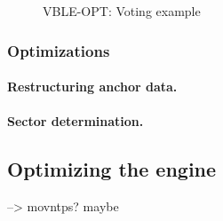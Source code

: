 \begin{figure}[h]
\begin{center}
\end{center}
\caption{VBLE-OPT: Voting example}
\label{fig:vbleexample}
\end{figure}

\subsubsection{Optimizations}

\paragraph{Restructuring anchor data.}
\paragraph{Sector determination.}

\subsection{Optimizing the engine}
--> movntps? maybe